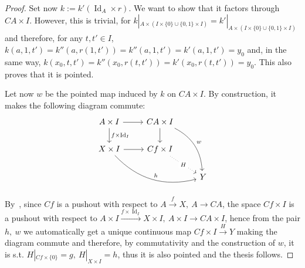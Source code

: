 \documentclass{article}
\newcommand{\exercise}[1]{\noindent {\bf Exercise #1}}
\DeclareMathOperator{\Id}{Id}
\begin{document}
\begin{proof}
	Set now $k:=k'(\Id_A\times r)$. We want to show that it factors through $CA\times I$. However, this is trivial, for $k|_{A\times(I\times\{0\}\cup\{0,1\}\times I)}=k'|_{A\times(I\times\{0\}\cup\{0,1\}\times I)}$ and therefore, for any $t,t'\in I$, $k(a,1,t')=k''(a,r(1,t'))=k''(a,1,t')=k'(a,1,t')=y_0$ and, in the same way, $k(x_0,t,t')=k''(x_0,r(t,t'))=k'(x_0,r(t,t'))=y_0$. This also proves that it is pointed.
	
	Let now $w$ be the pointed map induced by $k$ on $CA\times I$. By construction, it makes the following diagram commute:
	\[
		\begin{tikzcd}
			A\times I\arrow{r}\arrow{d}{f\times\Id_I}
			& CA\times I\arrow[bend left]{ddr}{w}\arrow{d} \\
			X\times I\arrow[bend right]{drr}{h}\arrow{r}
			& Cf\times I\arrow[dotted]{dr}[description]{H} \\
			&& Y
		\end{tikzcd}
	\]
	
	By~\cite[p. 50]{Sag17}, since $Cf$ is a pushout with respect to $A\xrightarrow{f} X,\ A\rightarrow CA$, the space $Cf\times I$ is a pushout with respect to $A\times I\xrightarrow{f\times\Id_I} X\times I,\ A\times I\rightarrow CA\times I$, hence from the pair $h,\ w$ we automatically get a unique continuous map $Cf\times I\xrightarrow{H} Y$ making the diagram commute and therefore, by commutativity and the construction of $w$, it is s.t. $H|_{Cf\times\{0\}}=g,\ H|_{X\times I}=h$, thus it is also pointed and the thesis follows.
\end{proof}


~\\
\exercise{5}
\end{document}
